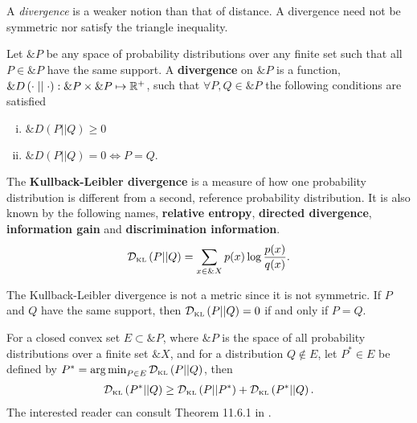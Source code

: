 \begin{remark}
  A \textit{divergence} is a weaker notion than that of distance. A divergence
  need not be symmetric nor satisfy the triangle inequality.
\end{remark}

\begin{definition}
  Let $\&P$ be any space of probability distributions over any finite set such
  that all
  $P \in \&P$ have the same support. A \textbf{divergence} on $\&P$ is a
  function, $\&D\left( \cdot \mid\mid \cdot \right): \&P \times \&P \mapsto
  \mathbb{R}^+$, such that $\forall P, Q \in \&P$ the following conditions are
  satisfied
  \begin{enumerate}[(i)]
  \item $\&D(P||Q) \geq 0$
  \item $\&D(P||Q) = 0 \iff P = Q$.
  \end{enumerate}
\end{definition}

\begin{definition}
  The \textbf{Kullback-Leibler divergence} is a measure of how one probability
  distribution is different from a second, reference probability distribution.
  It is also known by the following names, \textbf{relative entropy},
  \textbf{directed divergence}, \textbf{information gain} and
  \textbf{discrimination information}.
  \begin{align}
    \label{eq:KL}
    \mathcal{D}_{\text{\tiny KL}}\left( P \middle| \middle| Q \right) = \sum_{x \in \&X} p(x) \log{p(x) \over q(x)}.
  \end{align}
\end{definition}

The Kullback-Leibler divergence is not a metric since it is not symmetric. If
$P$ and $Q$ have the same support, then $\mathcal{D}_{\text{\tiny KL}}\left( P \middle| \middle| Q \right) = 0$ if and only if $P = Q$.

\begin{theorem}
  For a closed convex set $E \subset \&P$, where $\&P$ is the space of
  all probability distributions over a finite set $\&X$, and for a
  distribution $Q \not \in E$, let $P^* \in E$ be defined by
  $P^* = \operatorname*{arg\,min}_{P \in E} \mathcal{D}_{\text{\tiny KL}}\left( P \middle| \middle| Q \right)$, then
  \begin{align}
   \mathcal{D}_{\text{\tiny KL}}\left( P^* \middle| \middle| Q \right) \geq \mathcal{D}_{\text{\tiny KL}}\left( P \middle| \middle| P^* \right) + \mathcal{D}_{\text{\tiny KL}}\left( P^* \middle| \middle| Q \right).
  \end{align}
  The interested reader can consult Theorem 11.6.1 in \cite{ref:cover-thomas}.
\end{theorem}


